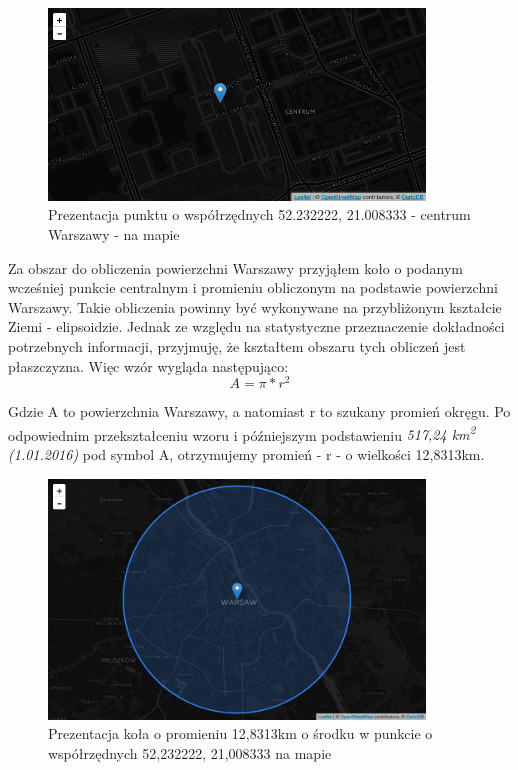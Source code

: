 \begin{figure}[h!]
  \centering
    \includegraphics[width=10cm]{images/warsaw-center}
  \caption{Prezentacja punktu o współrzędnych 52.232222, 21.008333 - centrum Warszawy - na mapie}
  \label{fig:warsawCenter}
\end{figure}


Za obszar do obliczenia powierzchni Warszawy przyjąłem koło o podanym wcześniej punkcie centralnym i promieniu obliczonym na podstawie powierzchni Warszawy\cite{WarszawaWiki}. Takie obliczenia powinny być wykonywane na przybliżonym kształcie Ziemi - elipsoidzie. Jednak ze względu na statystyczne przeznaczenie dokładności potrzebnych informacji, przyjmuję, że kształtem obszaru tych obliczeń jest płaszczyzna. Więc wzór wygląda następująco:
\[ A=\pi*r^2 \]

Gdzie A to powierzchnia Warszawy, a natomiast r to szukany promień okręgu. Po odpowiednim przekształceniu wzoru i późniejszym podstawieniu \textit{517,24 km\textsuperscript{2} (1.01.2016)}\cite{WarszawaWiki} pod symbol A, otrzymujemy promień - r - o wielkości 12,8313km.


\begin{figure}[h!]
  \centering
    \includegraphics[width=10cm]{images/warsaw-10km-radius}
  \caption{Prezentacja koła o promieniu 12,8313km o środku w punkcie o współrzędnych 52,232222, 21,008333 na mapie}
  \label{fig:warsaw10kmRadius}
\end{figure}

